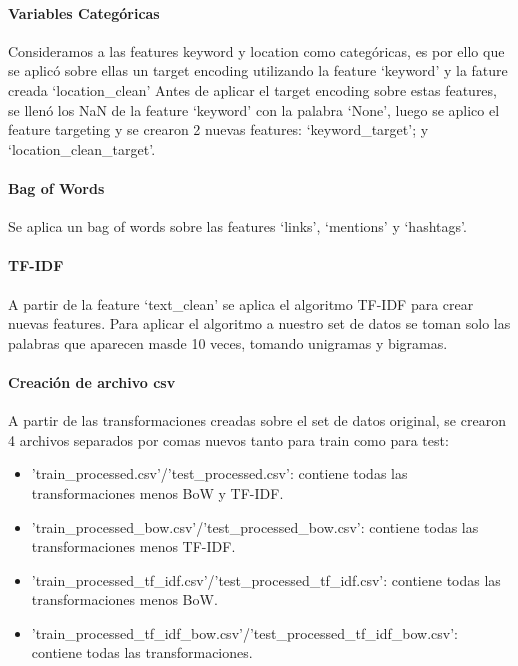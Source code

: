 \documentclass[12pt]{article}
\begin{document}
\paragraph{Variables Categóricas\\}
Consideramos a las features keyword y location como categóricas, es por ello que se aplicó sobre ellas un target encoding utilizando la feature ‘keyword’ y la fature creada ‘location\_clean’
Antes de aplicar el target encoding sobre estas features, se llenó los NaN de la feature ‘keyword’ con la palabra ‘None’, luego se aplico el feature targeting y se crearon 2 nuevas features: ‘keyword\_target’; y ‘location\_clean\_target’.


\paragraph{Bag of Words\\}
Se aplica un bag of words sobre las features ‘links’, ‘mentions’ y ‘hashtags’.


\paragraph{TF-IDF\\}
A partir de la feature ‘text\_clean’ se aplica el algoritmo TF-IDF para crear nuevas features.
Para aplicar el algoritmo a nuestro set de datos se toman solo las palabras que aparecen masde 10 veces, tomando unigramas y bigramas.

\paragraph{Creación de archivo csv\\}
A partir de las transformaciones creadas sobre el set de datos original, se crearon 4 archivos separados por comas nuevos tanto para train como para test:

\begin{itemize}
  \item 'train\_processed.csv'/'test\_processed.csv': contiene todas las transformaciones menos BoW y TF-IDF.
  \item 'train\_processed\_bow.csv'/'test\_processed\_bow.csv': contiene todas las transformaciones menos TF-IDF.
  \item 'train\_processed\_tf\_idf.csv'/'test\_processed\_tf\_idf.csv': contiene todas las transformaciones menos BoW.
  \item 'train\_processed\_tf\_idf\_bow.csv'/'test\_processed\_tf\_idf\_bow.csv': contiene todas las transformaciones.
\end{itemize}
\end{document}

